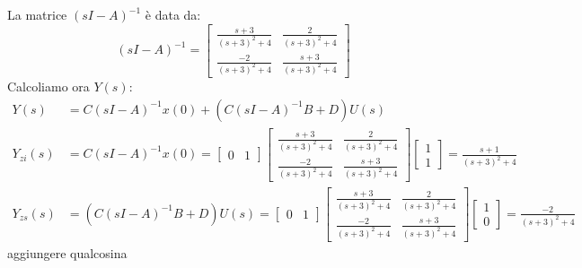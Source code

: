La matrice $(sI - A)^{-1}$ è data da:
\begin{equation}
    (sI - A)^{-1} = \begin{bmatrix} \frac{s + 3}{(s + 3)^2 + 4} & \frac{2}{(s + 3)^2 + 4} \\ \frac{-2}{(s + 3)^2 + 4} & \frac{s + 3}{(s + 3)^2 + 4} \end{bmatrix}
\end{equation}
Calcoliamo ora $Y(s)$:
\begin{align*}
    Y(s)      & = C (sI - A)^{-1} x(0) + (C (sI - A)^{-1} B + D) U(s)                                                                                                                                                                                                                              \\
    Y_{zi}(s) & = C (sI - A)^{-1} x(0) = \begin{bmatrix} 0 & 1 \end{bmatrix} \begin{bmatrix} \frac{s + 3}{(s + 3)^2 + 4} & \frac{2}{(s + 3)^2 + 4} \\ \frac{-2}{(s + 3)^2 + 4} & \frac{s + 3}{(s + 3)^2 + 4} \end{bmatrix} \begin{bmatrix} 1 \\ 1 \end{bmatrix} = \frac{s + 1}{(s + 3)^2 + 4}      \\
    Y_{zs}(s) & = (C (sI - A)^{-1} B + D) U(s) = \begin{bmatrix} 0 & 1 \end{bmatrix} \begin{bmatrix} \frac{s + 3}{(s + 3)^2 + 4} & \frac{2}{(s + 3)^2 + 4} \\ \frac{-2}{(s + 3)^2 + 4} & \frac{s + 3}{(s + 3)^2 + 4} \end{bmatrix} \begin{bmatrix} 1 \\ 0 \end{bmatrix} = \frac{-2}{(s + 3)^2 + 4}
\end{align*}
aggiungere qualcosina
